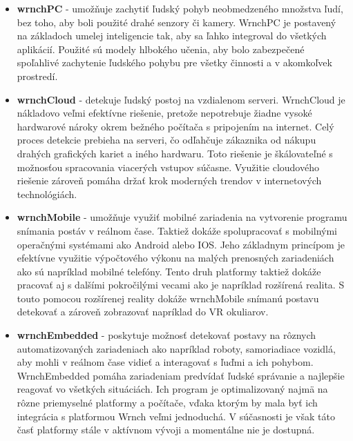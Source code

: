 \documentclass[slovak,master,dept460,male,cpp,cpdeclaration]{diploma}
\begin{document}
\begin{itemize}
\item \textbf{wrnchPC} - umožňuje zachytiť ľudský pohyb neobmedzeného množstva ľudí, bez toho, aby boli použité drahé senzory či kamery. WrnchPC je postavený na základoch  umelej inteligencie tak, aby sa ľahko integroval do všetkých aplikácií. Použité sú modely hlbokého učenia, aby bolo zabezpečené spoľahlivé zachytenie ľudského pohybu pre všetky činnosti a v akomkoľvek prostredí.


\item \textbf{wrnchCloud} - detekuje ľudský postoj na vzdialenom serveri. WrnchCloud je nákladovo veľmi efektívne riešenie, pretože nepotrebuje žiadne vysoké hardwarové nároky okrem bežného počítača s pripojením na internet. Celý proces detekcie prebieha na serveri, čo odľahčuje zákaznika od nákupu drahých grafických kariet a iného hardwaru. Toto riešenie je škálovateľné s možnosťou spracovania viacerých vstupov súčasne. Využitie cloudového riešenie zároveň pomáha držať krok moderných trendov v internetových technológiách.

\item \textbf{wrnchMobile } - umožňuje využiť mobilné zariadenia na vytvorenie programu snímania postáv v reálnom čase. Taktiež dokáže spolupracovať s mobilnými operačnými systémami ako Android alebo IOS. Jeho základnym princípom je efektívne využitie výpočtového výkonu  na malých prenosných zariadeniách ako sú napríklad mobilné telefóny. Tento druh platformy taktiež dokáže pracovať aj s dalšími pokročilými vecami ako je napríklad rozšírená realita. S touto pomocou rozšírenej reality dokáže wrnchMobile snímanú postavu detekovať a zároveň zobrazovať napríklad do VR okuliarov.


\item \textbf{wrnchEmbedded} - poskytuje možnosť detekovať postavy na rôznych automatizovaných zariadeniach ako napríklad roboty, samoriadiace vozidlá, aby mohli v reálnom čase vidieť a interagovať s ľuďmi a ich pohybom. WrnchEmbedded pomáha zariadeniam predvídať ľudské správanie a najlepšie reagovať vo všetkých situáciách. Ich program je optimalizovaný najmä na rôzne priemyselné platformy a počítače, vďaka ktorým by mala byť ich integrácia s platformou Wrnch veľmi jednoduchá. V súčasnosti je však táto časť platformy stále v aktívnom vývoji a momentálne nie je dostupná. 
\end{itemize}
\end{document}

